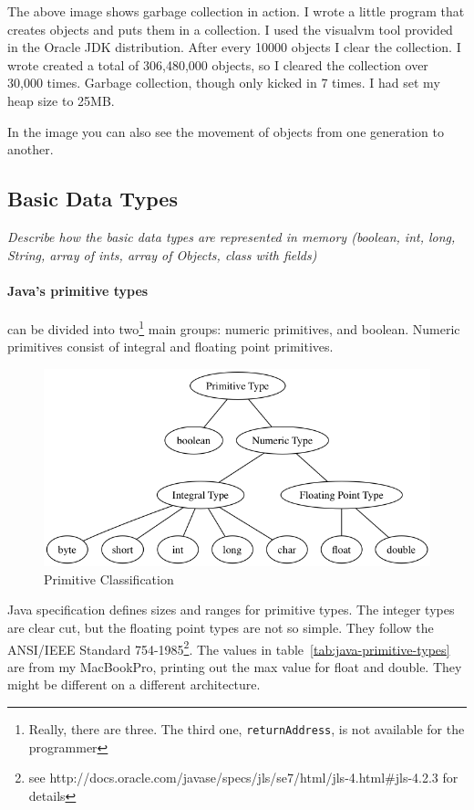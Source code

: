\documentclass[fleqn,10pt]{SelfArx} %
\begin{document}
The above image shows garbage collection in action. I wrote a little program that creates objects and puts them in a collection. I used the visualvm tool provided in the Oracle JDK distribution\cite{garbagecollection}. After every 10000 objects I clear the collection. I wrote created a total of 306,480,000 objects, so I cleared the collection over 30,000 times. Garbage collection, though only kicked in 7 times. I had set my heap size to 25MB. 

In the image you can also see the movement of objects from one generation to another.


\subsection{Basic Data Types}
\textit{Describe how the basic data types are represented in memory (boolean, int, long, String, array of ints, array of Objects, class with fields)}
\paragraph{Java's primitive types} can be divided into two\footnote{Really, there are three. The third one, \texttt{returnAddress}, is not available for the programmer} main groups: numeric primitives, and boolean. Numeric primitives consist of integral and floating point primitives.\cite{gosling}

\begin{figure}[H]\centering
\includegraphics[width=\linewidth]{primitives}
\caption{Primitive Classification}
\label{fig:results}
\end{figure}

Java specification\cite{gosling} defines sizes and ranges for primitive types. The integer types are clear cut, but the floating point types are not so simple. They follow the ANSI/IEEE Standard 754-1985\footnote{see http://docs.oracle.com/javase/specs/jls/se7/html/jls-4.html\#jls-4.2.3 for details}. The values in table~\ref{tab:java-primitive-types} are from my MacBookPro, printing out the max value for float and double. They might be different on a different architecture.
\end{document}
